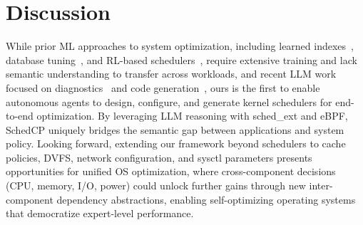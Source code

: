 \documentclass[preprint]{article}
\newcommand{\sys}{SchedCP\xspace}
\begin{document}
\section{Discussion}
\label{sec:discussion}

While prior ML approaches to system optimization, including learned indexes~\cite{kraska2018learned}, database tuning~\cite{marcus2019neo,vanaken2017ottertune}, and RL-based schedulers~\cite{mao2019decima,qiu2020firm,zhang2024mrsch,mao2019park}, require extensive training and lack semantic understanding to transfer across workloads, and recent LLM work focused on diagnostics~\cite{wang2024llmsys} and code generation~\cite{wei2024mapper,10.1145/3672197.3673434}, ours is the first to enable autonomous agents to design, configure, and generate kernel schedulers for end-to-end optimization. By leveraging LLM reasoning with sched\_ext and eBPF, \sys uniquely bridges the semantic gap between applications and system policy. Looking forward, extending our framework beyond schedulers to cache policies, DVFS, network configuration, and sysctl parameters presents opportunities for unified OS optimization, where cross-component decisions (CPU, memory, I/O, power) could unlock further gains through new inter-component dependency abstractions, enabling self-optimizing operating systems that democratize expert-level performance.



\end{document}
